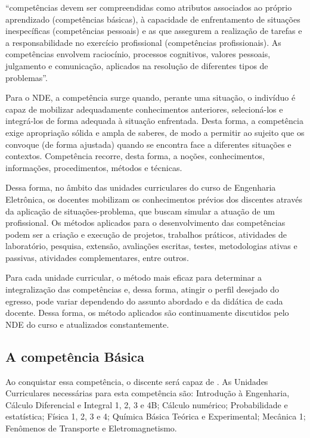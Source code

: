 \begin{citacao}
    ``competências devem ser compreendidas como atributos associados ao próprio aprendizado (competências básicas), à capacidade de enfrentamento de situações inespecíficas (competências pessoais) e as que assegurem a realização de tarefas e a responsabilidade no exercício profissional (competências profissionais).  As competências envolvem raciocínio, processos cognitivos, valores pessoais, julgamento e comunicação, aplicados na resolução de diferentes tipos de problemas''.
\end{citacao} 

Para o NDE, a competência surge quando, perante uma situação, o indivíduo é capaz de mobilizar adequadamente conhecimentos anteriores, selecioná-los e integrá-los de forma adequada à situação enfrentada. Desta forma, a competência exige apropriação sólida e ampla de saberes, de modo a permitir ao sujeito que os convoque (de forma ajustada) quando se encontra face a diferentes situações e contextos. Competência recorre, desta forma, a noções, conhecimentos, informações, procedimentos, métodos e técnicas.

Dessa forma, no âmbito das unidades curriculares do curso de Engenharia Eletrônica, os docentes mobilizam os conhecimentos prévios dos discentes através da aplicação de situações-problema, que buscam simular a atuação de um profissional. Os métodos aplicados para o desenvolvimento das competências podem ser a criação e execução de projetos, trabalhos práticos, atividades de laboratório, pesquisa, extensão, avaliações escritas, testes, metodologias ativas e passivas, atividades complementares, entre outros. 

Para cada unidade curricular, o método mais eficaz para determinar a integralização das competências e, dessa forma, atingir o perfil desejado do egresso, pode variar dependendo do assunto abordado e da didática de cada docente. Dessa forma, os método aplicados são continuamente discutidos pelo NDE do curso e atualizados constantemente.

\subsection{A competência Básica}

Ao conquistar essa competência, o discente será capaz de \textbf{\compBasica}. As Unidades Curriculares necessárias para esta competência são: Introdução à Engenharia, Cálculo Diferencial e Integral 1, 2, 3 e 4B; Cálculo numérico; Probabilidade e estatística; Física 1, 2, 3 e 4; Química Básica Teórica e Experimental; Mecânica 1; Fenômenos de Transporte e Eletromagnetismo.

